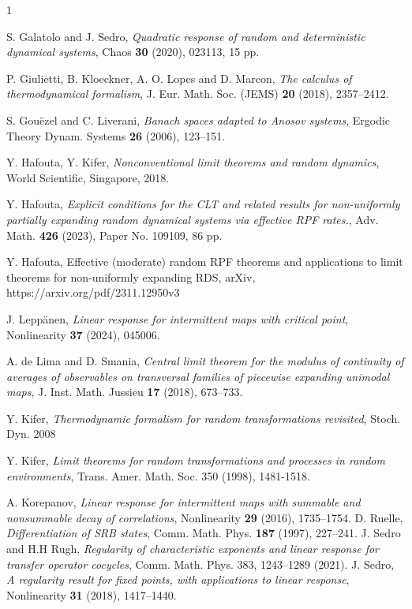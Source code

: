 \documentclass[11pt,reqno,a4paper]{article}
\theoremstyle{special}
\begin{document}
\begin{thebibliography}{1}
  
		 S. Galatolo and J. Sedro, \emph{Quadratic response of random and deterministic dynamical systems}, Chaos \textbf{30} (2020),  023113, 15 pp.

P. Giulietti, B. Kloeckner, A. O. Lopes and D. Marcon, \emph{The calculus of thermodynamical formalism}, J. Eur. Math. Soc. (JEMS) \textbf{20} (2018),  2357–2412.

 S. Gou\"{e}zel and C. Liverani, \emph{Banach spaces adapted to Anosov systems}, Ergodic Theory Dynam. Systems \textbf{26} (2006), 123--151. 



Y. Hafouta, Y. Kifer, {\em Nonconventional limit theorems and random dynamics}, World Scientific, Singapore, 2018.

Y. Hafouta, \emph{Explicit conditions for the CLT and related results for non-uniformly partially expanding random dynamical systems via effective RPF rates.}, Adv. Math. \textbf{426} (2023), Paper No. 109109, 86 pp.

Y. Hafouta, Effective (moderate) random RPF  theorems and applications to  limit theorems for non-uniformly expanding RDS, arXiv, https://arxiv.org/pdf/2311.12950v3

J. Lepp\"anen, \emph{Linear response for intermittent maps with critical point}, Nonlinearity \textbf{37} (2024), 045006.

A. de Lima and D. Smania, \emph{Central limit theorem for the modulus of continuity of averages of observables on transversal families of piecewise expanding unimodal maps}, J. Inst. Math. Jussieu \textbf{17} (2018),  673--733.


Y. Kifer, {\em Thermodynamic formalism for random transformations revisited}, Stoch. Dyn. 2008

Y. Kifer, {\em Limit theorems for random transformations and processes in random environments}, Trans. Amer. Math. Soc. 350 (1998), 1481-1518.

 A. Korepanov, \emph{Linear response for intermittent maps with summable and nonsummable decay of correlations}, Nonlinearity \textbf{29} (2016), 1735--1754.
 D. Ruelle, \emph{Differentiation of SRB states}, Comm. Math. Phys. \textbf{187} (1997),  227--241. 
		 J. Sedro and H.H Rugh, \emph{Regularity of characteristic exponents and linear response for transfer operator cocycles}, Comm. Math. Phys. 383, 1243--1289 (2021).
		 J. Sedro, \emph{A regularity result for fixed points, with applications to linear response},
		Nonlinearity \textbf{31} (2018),  1417--1440.
\end{thebibliography}
\end{document}
